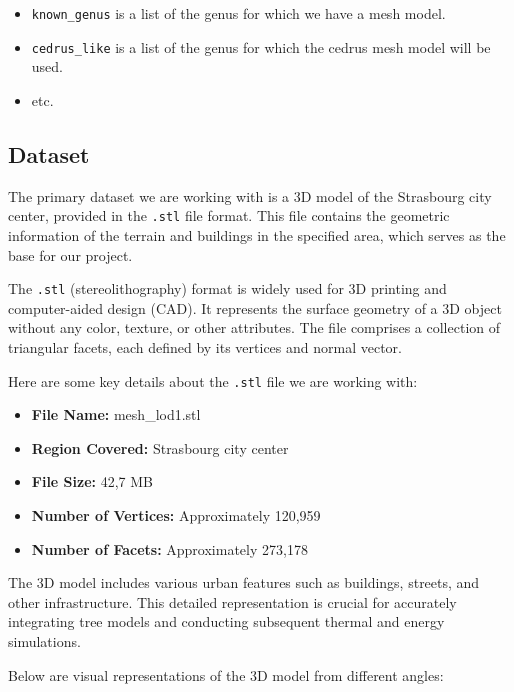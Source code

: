 \documentclass[12pt]{article}
\begin{document}
\begin{itemize}
    \item \texttt{known\_genus} is a list of the genus for which we have a mesh model.
    \item \texttt{cedrus\_like} is a list of the genus for which the cedrus mesh model will be used.
    \item etc.
\end{itemize}

\subsection{Dataset}

The primary dataset we are working with is a 3D model of the Strasbourg city
center, provided in the \texttt{.stl} file format. This file contains the
geometric information of the terrain and buildings in the specified area,
which serves as the base for our project.

The \texttt{.stl} (stereolithography) format is widely used for 3D printing
and computer-aided design (CAD). It represents the surface geometry of a 3D
object without any color, texture, or other attributes. The file comprises a
collection of triangular facets, each defined by its vertices and normal vector.

Here are some key details about the \texttt{.stl} file we are working with:
\begin{itemize}
    \item \textbf{File Name:} mesh\_lod1.stl
    \item \textbf{Region Covered:} Strasbourg city center
    \item \textbf{File Size:} 42,7 MB
    \item \textbf{Number of Vertices:} Approximately 120,959
    \item \textbf{Number of Facets:} Approximately 273,178
\end{itemize}

The 3D model includes various urban features such as buildings, streets, and
other infrastructure. This detailed representation is crucial for accurately
integrating tree models and conducting subsequent thermal and energy simulations.

Below are visual representations of the 3D model from different angles:
\end{document}
